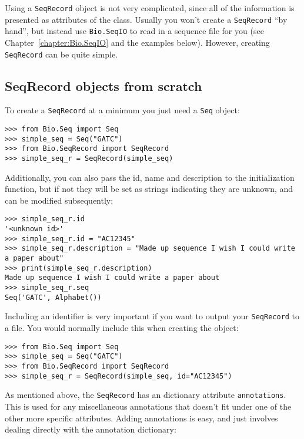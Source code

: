 Using a \verb|SeqRecord| object is not very complicated, since all of the
information is presented as attributes of the class. Usually you won't create
a \verb|SeqRecord| ``by hand'', but instead use \verb|Bio.SeqIO| to read in a
sequence file for you (see Chapter~\ref{chapter:Bio.SeqIO} and the examples
below).  However, creating \verb|SeqRecord| can be quite simple.

\subsection{SeqRecord objects from scratch}

To create a \verb|SeqRecord| at a minimum you just need a \verb|Seq| object:

\begin{verbatim}
>>> from Bio.Seq import Seq
>>> simple_seq = Seq("GATC")
>>> from Bio.SeqRecord import SeqRecord
>>> simple_seq_r = SeqRecord(simple_seq)
\end{verbatim}

Additionally, you can also pass the id, name and description to the initialization function, but if not they will be set as strings indicating they are unknown, and can be modified subsequently:

\begin{verbatim}
>>> simple_seq_r.id
'<unknown id>'
>>> simple_seq_r.id = "AC12345"
>>> simple_seq_r.description = "Made up sequence I wish I could write a paper about"
>>> print(simple_seq_r.description)
Made up sequence I wish I could write a paper about
>>> simple_seq_r.seq
Seq('GATC', Alphabet())
\end{verbatim}

Including an identifier is very important if you want to output your \verb|SeqRecord| to a file.  You would normally include this when creating the object:

\begin{verbatim}
>>> from Bio.Seq import Seq
>>> simple_seq = Seq("GATC")
>>> from Bio.SeqRecord import SeqRecord
>>> simple_seq_r = SeqRecord(simple_seq, id="AC12345")
\end{verbatim}

As mentioned above, the \verb|SeqRecord| has an dictionary attribute \verb|annotations|. This is used
for any miscellaneous annotations that doesn't fit under one of the other more specific attributes.
Adding annotations is easy, and just involves dealing directly with the annotation dictionary:

